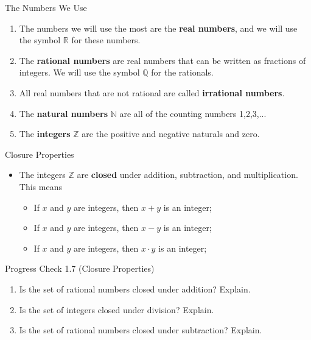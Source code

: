 \documentclass{beamer}
\begin{document}
\begin{frame}{The Numbers We Use}
	\begin{enumerate}
		\item The numbers we will use the most are the \textbf{real numbers}, and we will use the symbol $\mathbb{R}$ for these numbers.
		\item The \textbf{rational numbers} are real numbers that can be written as fractions of integers.  We will use the symbol $\mathbb{Q}$ for the rationals.
		\item All real numbers that are not rational are called \textbf{irrational numbers}.
		\item The \textbf{natural numbers} $\mathbb{N}$ are all of the counting numbers 1,2,3,...
		\item The \textbf{integers} $\mathbb{Z}$ are the positive and negative naturals and zero.
	\end{enumerate}
\end{frame}

\begin{frame}{Closure Properties}
	\begin{itemize}
		\item The integers $\mathbb{Z}$ are \textbf{closed} under addition, subtraction, and multiplication.  This means
		\begin{itemize}
			\item If $x$ and $y$ are integers, then $x + y$ is an integer;
			\item If $x$ and $y$ are integers, then $x - y$ is an integer;
			\item If $x$ and $y$ are integers, then $x \cdot y$ is an integer;
		\end{itemize}
	\end{itemize}
\end{frame}

\begin{frame}{Progress Check 1.7 (Closure Properties)}
	\begin{enumerate}
		\item Is the set of rational numbers closed under addition? Explain.
		\item Is the set of integers closed under division? Explain.
		\item Is the set of rational numbers closed under subtraction? Explain.
	\end{enumerate}
\end{frame}
\end{document}
